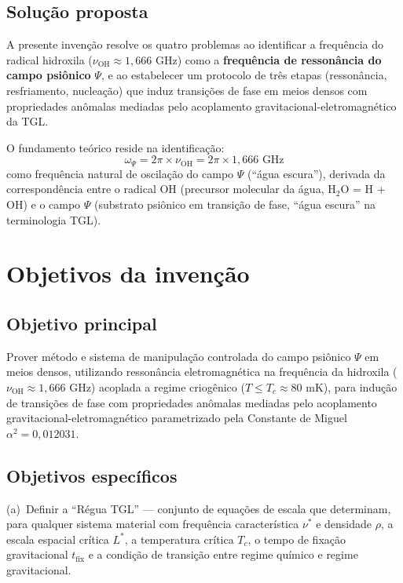 \documentclass[12pt,a4paper]{article}
\newcommand{\alphaii}{\alpha^2}
\newcommand{\nuOH}{\nu_{\text{OH}}}
\newcommand{\tfix}{t_{\text{fix}}}
\newcommand{\Tcrit}{T_c}
\begin{document}
\subsection{Solução proposta}

A presente invenção resolve os quatro problemas ao identificar
a frequência do radical hidroxila ($\nuOH \approx 1{,}666$ GHz)
como a \textbf{frequência de ressonância do campo psiônico}
$\Psi$, e ao estabelecer um protocolo de três etapas
(ressonância, resfriamento, nucleação) que induz transições de
fase em meios densos com propriedades anômalas mediadas pelo
acoplamento gravitacional-eletromagnético da TGL.

O fundamento teórico reside na identificação:
\begin{equation}
\boxed{\omega_\Psi = 2\pi \times \nuOH = 2\pi \times 1{,}666
  \text{ GHz}}
\end{equation}
como frequência natural de oscilação do campo $\Psi$ (``água
escura''), derivada da correspondência entre o radical OH
(precursor molecular da água, H$_2$O = H + OH) e o campo
$\Psi$ (substrato psiônico em transição de fase, ``água
escura'' na terminologia TGL).

\newpage
\section{Objetivos da invenção}

\subsection{Objetivo principal}

Prover método e sistema de manipulação controlada do campo
psiônico $\Psi$ em meios densos, utilizando ressonância
eletromagnética na frequência da hidroxila ($\nuOH \approx
1{,}666$ GHz) acoplada a regime criogênico ($T \leq \Tcrit
\approx 80$ mK), para indução de transições de fase com
propriedades anômalas mediadas pelo acoplamento
gravitacional-eletromagnético parametrizado pela Constante
de Miguel $\alphaii = 0{,}012031$.

\subsection{Objetivos específicos}

(a)~Definir a ``Régua TGL'' --- conjunto de equações de escala
que determinam, para qualquer sistema material com frequência
característica $\nu^*$ e densidade $\rho$, a escala espacial
crítica $L^*$, a temperatura crítica $\Tcrit$, o tempo de
fixação gravitacional $\tfix$ e a condição de transição entre
regime químico e regime gravitacional.
\end{document}
